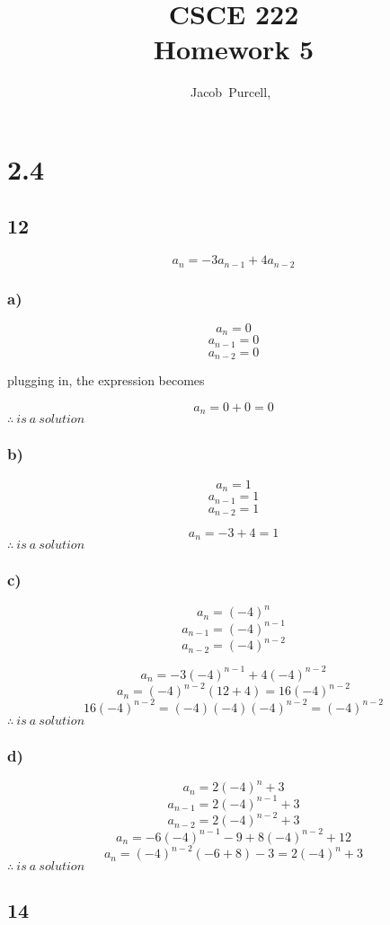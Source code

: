 \documentclass[journal]{IEEEtran}
\begin{document}
\title{CSCE 222 \\ Homework 5}

\author{Jacob~Purcell,~}

\maketitle
\section*{2.4}
\subsection*{12}
\begin{equation}
    a_n = -3a_{n-1}+4a_{n-2}
\end{equation}
\subsubsection*{a)}
$$a_n = 0$$
$$a_{n-1} = 0$$
$$a_{n-2} = 0$$

plugging in, the expression becomes

$$a_n = 0 + 0 = 0$$
$\boxed{\therefore~is~a~solution}$

\subsubsection*{b)}
$$a_n = 1$$
$$a_{n-1} = 1$$
$$a_{n-2} = 1$$

$$a_n = -3 + 4 = 1$$
$\boxed{\therefore~is~a~solution}$

\subsubsection*{c)}
$$a_n = (-4)^n$$
$$a_{n-1} = (-4)^{n-1}$$
$$a_{n-2} = (-4)^{n-2}$$

$$a_n = -3(-4)^{n-1} + 4(-4)^{n-2} $$
$$a_n = (-4)^{n-2}(12 + 4) = 16(-4)^{n-2}$$
$$16(-4)^{n-2} = (-4)(-4)(-4)^{n-2} = (-4)^{n-2}$$
$\boxed{\therefore~is~a~solution}$

\subsubsection*{d)}
$$a_n = 2(-4)^n+3$$
$$a_{n-1} = 2(-4)^{n-1}+3$$
$$a_{n-2} = 2(-4)^{n-2}+3$$
$$a_n = -6(-4)^{n-1} - 9 + 8(-4)^{n-2} + 12 $$
$$a_n = (-4)^{n-2}(-6 + 8) - 3 = 2(-4)^n+3$$
$\boxed{\therefore~is~a~solution}$


\subsection*{14}
\end{document}
